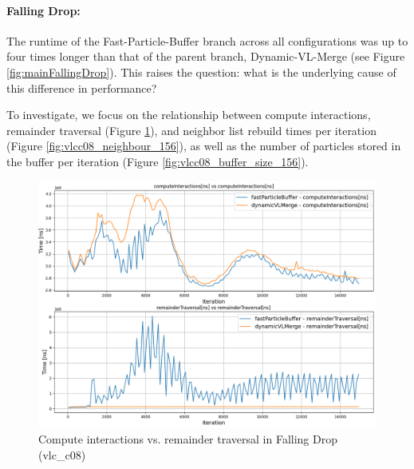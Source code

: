 \paragraph{Falling Drop:}

The runtime of the Fast-Particle-Buffer branch across all configurations was up to four times longer than that of the parent branch, Dynamic-VL-Merge (see Figure \ref{fig:mainFallingDrop}). This raises the question: what is the underlying cause of this difference in performance? 

To investigate, we focus on the relationship between  compute interactions, remainder traversal (Figure \ref{fig:vlcc08inter156}), and neighbor list rebuild times per iteration (Figure \ref{fig:vlcc08_neighbour_156}), as well as the number of particles stored in the buffer per iteration (Figure \ref{fig:vlcc08_buffer_size_156}).



\begin{figure}[htbp]
    \centering
        \includegraphics[width=0.9\linewidth]{graphs/fallingDrop/normalExperiments/freq/vlcc08inter156.png}
        \vspace{-0.5em}
        \caption{Compute interactions vs. remainder traversal in Falling Drop (vlc\_c08)}
        \label{fig:vlcc08inter156}
\end{figure}

